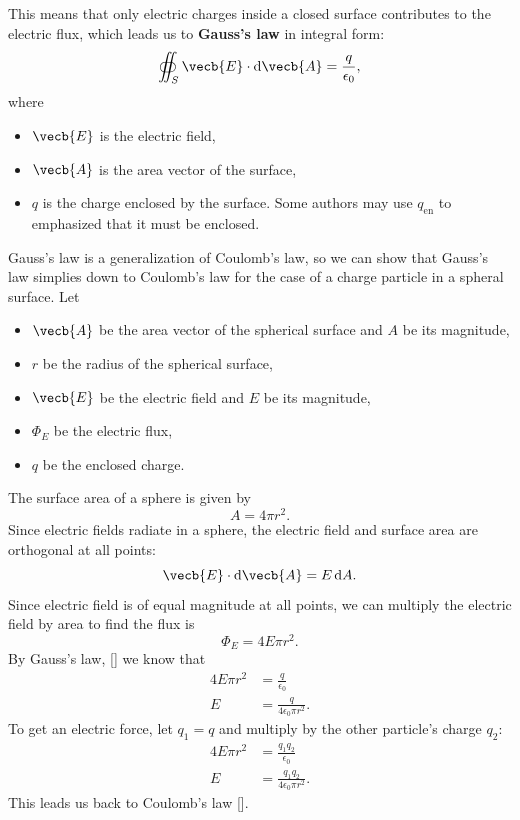 This means that only electric charges inside a closed surface
contributes to the electric flux,
which leads us to \textbf{Gauss's law} in integral form:
\begin{equation} \label{eq:gausss-law}
    \oiint_S \vecb{E} \cdot \odif{\vecb{A}} = \frac{q}{\epsilon_0},
\end{equation}
where
\begin{itemize}
    \item \(\vecb{E}\) is the electric field,
    \item \(\vecb{A}\) is the area vector of the surface,
    \item \(q\) is the charge enclosed by the surface.
        Some authors may use \(q_\mathrm{en}\)
        to emphasized that it must be enclosed.
\end{itemize}

Gauss's law is a generalization of Coulomb's law,
so we can show that Gauss's law simplies down to Coulomb's law
for the case of a charge particle in a spheral surface.
Let
\begin{itemize}
    \item \(\vecb{A}\) be the area vector of the spherical surface
        and \(A\) be its magnitude,
    \item \(r\) be the radius of the spherical surface,
    \item \(\vecb{E}\) be the electric field and \(E\) be its magnitude,
    \item \(\Phi_E\) be the electric flux,
    \item \(q\) be the enclosed charge.
\end{itemize}
The surface area of a sphere is given by
\begin{equation}
    A = 4 \pi r^2.
\end{equation}
Since electric fields radiate in a sphere,
the electric field and surface area are orthogonal at all points:
\begin{equation}
    \vecb{E} \cdot \odif{\vecb{A}} = E \odif{A}.
\end{equation}
Since electric field is of equal magnitude at all points,
we can multiply the electric field by area to find the flux is
\begin{equation}
    \Phi_E = 4 E \pi r^2.
\end{equation}
By Gauss's law, [] we know that
\begin{equation}
    \begin{aligned}
        4 E \pi r^2 &= \frac{q}{\epsilon_0} \\
        E &= \frac{q}{4 \epsilon_0 \pi r^2}.
    \end{aligned}
\end{equation}
To get an electric force,
let \(q_1 = q\) and multiply by the other particle's charge \(q_2\):
\begin{equation*}
    \begin{aligned}
        4 E \pi r^2 &= \frac{q_1 q_2}{\epsilon_0} \\
        E &= \frac{q_1 q_2}{4 \epsilon_0 \pi r^2}.
    \end{aligned}
\end{equation*}
This leads us back to Coulomb's law [].

